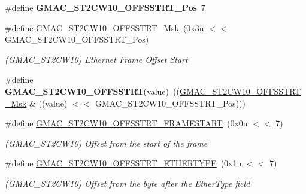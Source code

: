 \begin{DoxyCompactItemize}
\item 
\mbox{\label{group__SAMV71__GMAC_ga15116176e8936f68ba93463dd2d1c7a6}} 
\#define {\bfseries G\+M\+A\+C\+\_\+\+S\+T2\+C\+W10\+\_\+\+O\+F\+F\+S\+S\+T\+R\+T\+\_\+\+Pos}~7
\item 
\mbox{\label{group__SAMV71__GMAC_gabc8690fb601150d928fd4632e489bad7}} 
\#define \mbox{\hyperlink{group__SAMV71__GMAC_gabc8690fb601150d928fd4632e489bad7}{G\+M\+A\+C\+\_\+\+S\+T2\+C\+W10\+\_\+\+O\+F\+F\+S\+S\+T\+R\+T\+\_\+\+Msk}}~(0x3u $<$$<$ G\+M\+A\+C\+\_\+\+S\+T2\+C\+W10\+\_\+\+O\+F\+F\+S\+S\+T\+R\+T\+\_\+\+Pos)
\begin{DoxyCompactList}\small\item\em (G\+M\+A\+C\+\_\+\+S\+T2\+C\+W10) Ethernet Frame Offset Start \end{DoxyCompactList}\item 
\mbox{\label{group__SAMV71__GMAC_ga18db0524df2c5c282278fa857ab81715}} 
\#define {\bfseries G\+M\+A\+C\+\_\+\+S\+T2\+C\+W10\+\_\+\+O\+F\+F\+S\+S\+T\+RT}(value)~((\mbox{\hyperlink{group__SAMV71__GMAC_gabc8690fb601150d928fd4632e489bad7}{G\+M\+A\+C\+\_\+\+S\+T2\+C\+W10\+\_\+\+O\+F\+F\+S\+S\+T\+R\+T\+\_\+\+Msk}} \& ((value) $<$$<$ G\+M\+A\+C\+\_\+\+S\+T2\+C\+W10\+\_\+\+O\+F\+F\+S\+S\+T\+R\+T\+\_\+\+Pos)))
\item 
\mbox{\label{group__SAMV71__GMAC_gacea406e2cd17ddd6176a03a21330a7fd}} 
\#define \mbox{\hyperlink{group__SAMV71__GMAC_gacea406e2cd17ddd6176a03a21330a7fd}{G\+M\+A\+C\+\_\+\+S\+T2\+C\+W10\+\_\+\+O\+F\+F\+S\+S\+T\+R\+T\+\_\+\+F\+R\+A\+M\+E\+S\+T\+A\+RT}}~(0x0u $<$$<$ 7)
\begin{DoxyCompactList}\small\item\em (G\+M\+A\+C\+\_\+\+S\+T2\+C\+W10) Offset from the start of the frame \end{DoxyCompactList}\item 
\mbox{\label{group__SAMV71__GMAC_ga8618cf4caf24778aa490141670cb1c78}} 
\#define \mbox{\hyperlink{group__SAMV71__GMAC_ga8618cf4caf24778aa490141670cb1c78}{G\+M\+A\+C\+\_\+\+S\+T2\+C\+W10\+\_\+\+O\+F\+F\+S\+S\+T\+R\+T\+\_\+\+E\+T\+H\+E\+R\+T\+Y\+PE}}~(0x1u $<$$<$ 7)
\begin{DoxyCompactList}\small\item\em (G\+M\+A\+C\+\_\+\+S\+T2\+C\+W10) Offset from the byte after the Ether\+Type field \end{DoxyCompactList}\item 

\end{DoxyCompactItemize}
